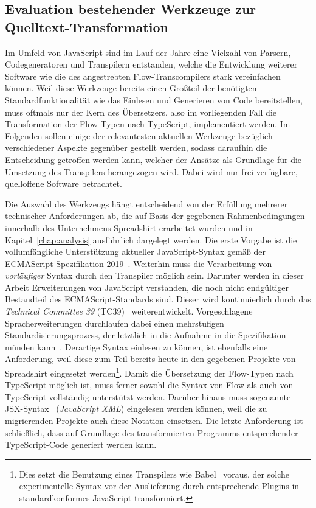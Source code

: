 \subsection{Evaluation bestehender Werkzeuge zur Quelltext-Transformation}
\label{sec:js-transpilers}

Im Umfeld von JavaScript sind im Lauf der Jahre eine Vielzahl von Parsern, Codegeneratoren und Transpilern entstanden, welche die Entwicklung weiterer Software wie die des angestrebten Flow-Transcompilers stark vereinfachen können. Weil diese Werkzeuge bereits einen Großteil der benötigten Standardfunktionalität wie das Einlesen und Generieren von Code bereitstellen, muss oftmals nur der Kern des Übersetzers, also im vorliegenden Fall die Transformation der Flow-Typen nach TypeScript, implementiert werden. Im Folgenden sollen einige der relevantesten aktuellen Werkzeuge bezüglich verschiedener Aspekte gegenüber gestellt werden, sodass daraufhin die Entscheidung getroffen werden kann, welcher der Ansätze als Grundlage für die Umsetzung des Transpilers herangezogen wird. Dabei wird nur frei verfügbare, quelloffene Software betrachtet.

Die Auswahl des Werkzeugs hängt entscheidend von der Erfüllung mehrerer technischer Anforderungen ab, die auf Basis der gegebenen Rahmenbedingungen innerhalb des Unternehmens Spreadshirt erarbeitet wurden und in Kapitel~\ref{chap:analysis} ausführlich dargelegt werden. Die erste Vorgabe ist die vollumfängliche Unterstützung aktueller JavaScript-Syntax gemäß der ECMAScript-Spezifikation 2019~\autocite{ECMASCRIPT:2019}. Weiterhin muss die Verarbeitung von \emph{vorläufiger} Syntax durch den Transpiler möglich sein. Darunter werden in dieser Arbeit Erweiterungen von JavaScript verstanden, die noch nicht endgültiger Bestandteil des ECMAScript-Standards sind. Dieser wird kontinuierlich durch das \textit{Technical Committee 39} (TC39)~\autocite{TC39_COMMITTEE} weiterentwickelt. Vorgeschlagene Spracherweiterungen durchlaufen dabei einen mehrstufigen Standardisierungsprozess, der letztlich in die Aufnahme in die Spezifikation münden kann~\autocite{TC39_PROCESS}. Derartige Syntax einlesen zu können, ist ebenfalls eine Anforderung, weil diese zum Teil bereits heute in den gegebenen Projekte von Spreadshirt eingesetzt werden\footnote{Dies setzt die Benutzung eines Transpilers wie Babel~\autocite{BABEL} voraus, der solche experimentelle Syntax vor der Auslieferung durch entsprechende Plugins in standardkonformes JavaScript transformiert.}. Damit die Übersetzung der Flow-Typen nach TypeScript möglich ist, muss ferner sowohl die Syntax von Flow als auch von TypeScript vollständig unterstützt werden. Darüber hinaus muss sogenannte JSX-Syntax~\autocite{SOFTWARE:JSX} (\textit{JavaScript XML}) eingelesen werden können, weil die zu migrierenden Projekte auch diese Notation einsetzen. Die letzte Anforderung ist schließlich, dass auf Grundlage des transformierten Programms entsprechender TypeScript-Code generiert werden kann.

